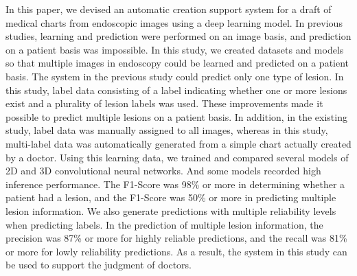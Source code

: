 In this paper, we devised an automatic creation support system for a draft of medical charts from endoscopic images using a deep learning model.
In previous studies, learning and prediction were performed on an image basis, and prediction on a patient basis was impossible.
In this study, we created datasets and models so that multiple images in endoscopy could be learned and predicted on a patient basis.
The system in the previous study could predict only one type of lesion.
In this study, label data consisting of a label indicating whether one or more lesions exist and a plurality of lesion labels was used.
These improvements made it possible to predict multiple lesions on a patient basis.
In addition, in the existing study, label data was manually assigned to all images, whereas in this study, multi-label data was automatically generated from a simple chart actually created by a doctor.
Using this learning data, we trained and compared several models of 2D and 3D convolutional neural networks. 
And some models recorded high inference performance.
The F1-Score was 98\% or more in determining whether a patient had a lesion, and the F1-Score was 50\% or more in predicting multiple lesion information.
We also generate predictions with multiple reliability levels when predicting labels.
In the prediction of multiple lesion information, the precision was 87\% or more for highly reliable predictions, and the recall was 81\% or more for lowly reliability predictions.
As a result, the system in this study can be used to support the judgment of doctors.

